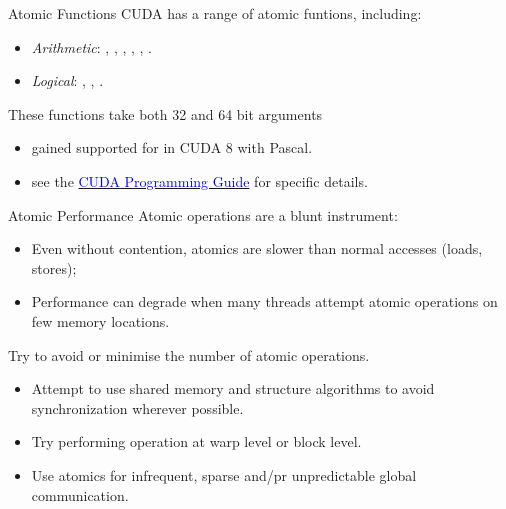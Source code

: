 \documentclass[aspectratio=43]{beamer}
\begin{document}
\begin{frame}[fragile]{Atomic Functions}
    CUDA has a range of atomic funtions, including:
    \begin{itemize}
        \item \emph{Arithmetic}:
            , , , , , .
        \item \emph{Logical}: 
            , , .
    \end{itemize}
    These functions take both 32 and 64 bit arguments
    \begin{itemize}
        \item {} gained supported for  in CUDA 8 with Pascal.
        \item see the \href{https://docs.nvidia.com/cuda/cuda-c-programming-guide/index.html#atomic-functions}{\textcolor{blue}{CUDA Programming Guide}} for specific details.
    \end{itemize}
\end{frame}

\begin{frame}[fragile]{Atomic Performance}
    Atomic operations are a blunt instrument:
    \begin{itemize}
        \item Even without contention, atomics are slower than normal accesses (loads, stores);
        \item Performance can degrade when many threads attempt atomic operations on few memory locations.
    \end{itemize}
    Try to avoid or minimise the number of atomic operations.
    \begin{itemize}
        \item Attempt to use shared memory and structure algorithms to avoid synchronization wherever possible.
        \item Try performing operation at warp level or block level.
        \item Use atomics for infrequent, sparse and/pr unpredictable global communication.
    \end{itemize}
\end{frame}
\end{document}
